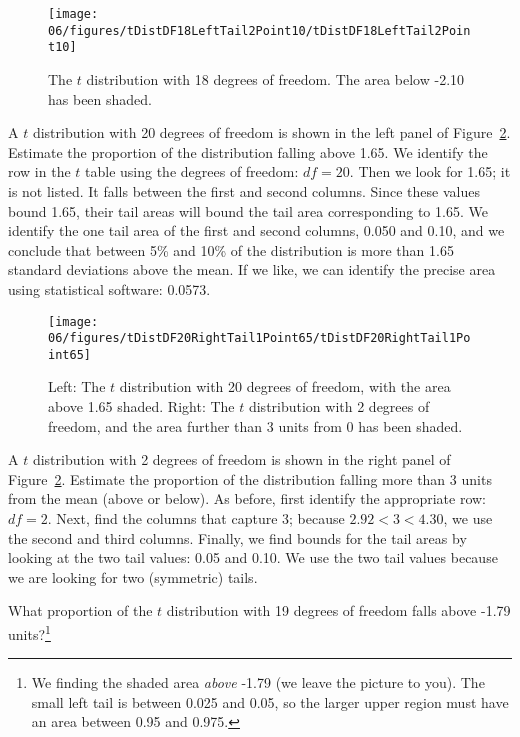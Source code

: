 \begin{figure}
\centering
\texttt{[image: 06/figures/tDistDF18LeftTail2Point10/tDistDF18LeftTail2Point10]}
\caption{The $t$ distribution with 18 degrees of freedom. The area below -2.10 has been shaded.}
\label{tDistDF18LeftTail2Point10}
\end{figure}

\begin{example}{A $t$ distribution with 20 degrees of freedom is shown in the left panel of Figure~\ref{tDistDF20RightTail1Point65}. Estimate the proportion of the distribution falling above 1.65.}
We identify the row in the $t$ table using the degrees of freedom: $df=20$. Then we look for 1.65; it is not listed. It falls between the first and second columns. Since these values bound 1.65, their tail areas will bound the tail area corresponding to 1.65. We identify the one tail area of the first and second columns, 0.050 and 0.10, and we conclude that between 5\% and 10\% of the distribution is more than 1.65 standard deviations above the mean. If we like, we can identify the precise area using statistical software: 0.0573.
\end{example}

\begin{figure}
\centering
\texttt{[image: 06/figures/tDistDF20RightTail1Point65/tDistDF20RightTail1Point65]}
\caption{Left: The $t$ distribution with 20 degrees of freedom, with the area above 1.65 shaded. Right: The $t$ distribution with 2 degrees of freedom, and the area further than 3 units from 0 has been shaded.}
\label{tDistDF20RightTail1Point65}
\end{figure}

\begin{example}{A $t$ distribution with 2 degrees of freedom is shown in the right panel of Figure~\ref{tDistDF20RightTail1Point65}. Estimate the proportion of the distribution falling more than 3 units from the mean (above or below).}
As before, first identify the appropriate row: $df=2$. Next, find the columns that capture 3; because $2.92 < 3 < 4.30$, we use the second and third columns. Finally, we find bounds for the tail areas by looking at the two tail values: 0.05 and 0.10. We use the two tail values because we are looking for two (symmetric) tails. %
\end{example}

\begin{exercise}
What proportion of the $t$ distribution with 19 degrees of freedom falls above -1.79 units?\footnote{We finding the shaded area \emph{above} -1.79 (we leave the picture to you). The small left tail is between 0.025 and 0.05, so the larger upper region must have an area between 0.95 and 0.975.}
\end{exercise}



